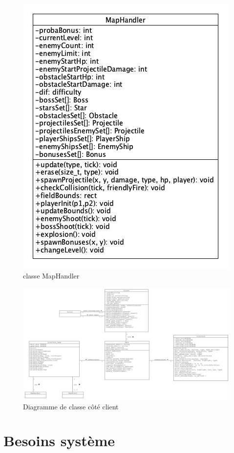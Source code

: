 \documentclass[a4paper,12pt]{article}
\begin{document}
\begin{figure}[hbtp]
\centering
\includegraphics[scale=0.3]{images/mapHandlerDiagram.jpg}
\caption{classe MapHandler}
\end{figure}

\begin{figure}[hbtp]
\centering
\includegraphics[scale=0.3, angle=90]{images/newClientClassDiagram.jpg}
\caption{Diagramme de classe côté client}
\end{figure}

\newpage

\section{Besoins système}
\end{document}
